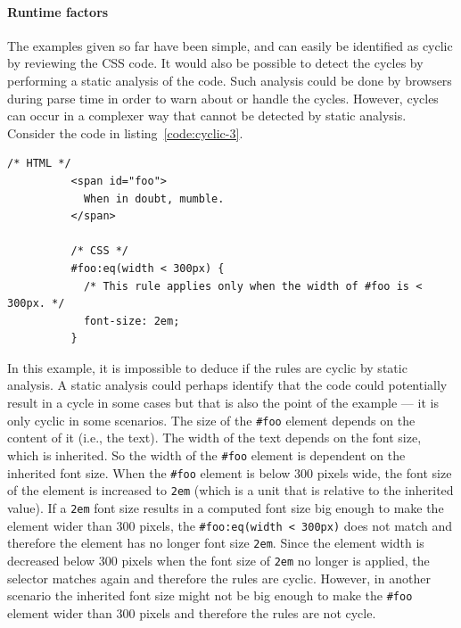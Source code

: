 \documentclass[a4paper,11pt]{kth-mag}
\newcommand{\code}[1]{\texttt{#1}}
\begin{document}
        \paragraph{Runtime factors}
        The examples given so far have been simple, and can easily be identified as cyclic by reviewing the \gls{CSS} code.
        It would also be possible to detect the cycles by performing a static analysis of the code.
        Such analysis could be done by \glspl{browser} during parse time in order to warn about or handle the cycles.
        However, cycles can occur in a complexer way that cannot be detected by static analysis.
        Consider the code in listing~\ref{code:cyclic-3}.
        \begin{lstlisting}[gobble=10,caption={Example of cyclic rules that cannot be detected by static analysis.}, captionpos=b, label={code:cyclic-3}]
          /* HTML */
          <span id="foo">
            When in doubt, mumble.
          </span>

          /* CSS */
          #foo:eq(width < 300px) {
            /* This rule applies only when the width of #foo is < 300px. */
            font-size: 2em;
          }
        \end{lstlisting}
        In this example, it is impossible to deduce if the rules are cyclic by static analysis.
        A static analysis could perhaps identify that the code could potentially result in a cycle in some cases but that is also the point of the example --- it is only cyclic in some scenarios.
        The size of the \code{\#foo} element depends on the content of it (i.e., the text).
        The width of the text depends on the font size, which is inherited.
        So the width of the \code{\#foo} \gls{element} is dependent on the inherited font size.
        When the \code{\#foo} \gls{element} is below 300 pixels wide, the font size of the element is increased to \code{2em} (which is a unit that is relative to the inherited value).
        If a \code{2em} font size results in a computed font size big enough to make the \gls{element} wider than 300 pixels, the \code{\#foo:eq(width < 300px)} does not match and therefore the element has no longer font size \code{2em}.
        Since the element width is decreased below 300 pixels when the font size of \code{2em} no longer is applied, the selector matches again and therefore the rules are cyclic.
        However, in another scenario the inherited font size might not be big enough to make the \code{\#foo} element wider than 300 pixels and therefore the rules are not cycle.
\end{document}
